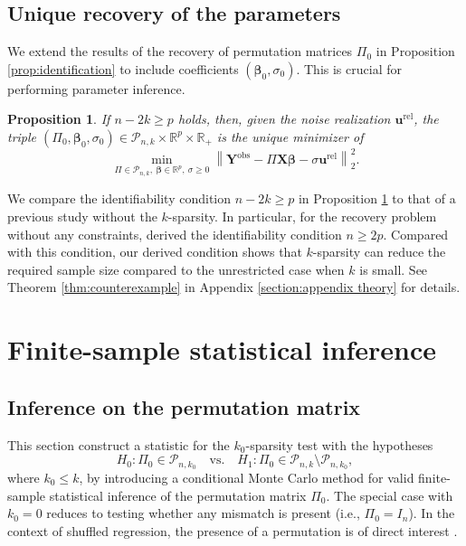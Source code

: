 \documentclass[11pt, reqno]{amsart}
\newcommand{\R}{\mathbb{R}}
\renewcommand{\le}{\leqslant}
\renewcommand{\ge}{\geqslant}
\newcommand{\mP}{\mathcal{P}}
\newcommand{\1}{\mbox{1}\hspace{-0.25em}\mbox{l}}
\newcommand{\obs}{\mathrm{obs}}
\newcommand{\rel}{\mathrm{rel}}
\theoremstyle{definition}\newtheorem{problem}{Problem}[section]
\theoremstyle{definition}\newtheorem{definition}[problem]{Definition}
\theoremstyle{remark}\newtheorem{assumption}{Assumption}
\theoremstyle{remark}\newtheorem{remark}[problem]{Remark}
\theoremstyle{definition}\newtheorem{example}[problem]{Example}
\theoremstyle{plain}\newtheorem{theorem}[problem]{Theorem}
\theoremstyle{plain}\newtheorem{question}[problem]{Question}
\theoremstyle{plain}\newtheorem{lemma}[problem]{Lemma}
\theoremstyle{plain}\newtheorem{proposition}[problem]{Proposition}
\theoremstyle{plain}\newtheorem{corollary}[problem]{Corollary}
\theoremstyle{plain}\newtheorem{conjecture}[problem]{Conjecture}
\begin{document}
\subsection{Unique recovery of the parameters}

We extend the results of the recovery of permutation matrices $\Pi_0$ in Proposition \ref{prop:identification} to include coefficients $(\bm{\beta}_0, \sigma_0) $. This is crucial for performing parameter inference.

\begin{proposition}\label{prop:identification_joint}
    If $n-2k\ge p$ holds, then, given the noise realization $\bm u^{\rel}$, the triple $(\Pi_0,\bm\beta_0,\sigma_0) \in \mP_{n,k} \times \R^p \times \R_+$ is the unique minimizer of
\begin{equation}\label{eq:repro_ideal}
   \min_{\Pi \in \mP_{n,k},\ \bm{\beta} \in \R^p,\ \sigma \ge 0 }
   \left\| \bm{Y}^{\obs} -  \Pi \bm{X} \bm{\beta} - \sigma \bm{u}^{\rel}\right\|_2^2.
\end{equation}
\end{proposition}
 
We compare the identifiability condition $n-2k\ge p$ in Proposition \ref{prop:identification_joint} to that of a previous study without the $k$-sparsity.
In particular, for the recovery problem without any constraints,  \citep{unnikrishnan2018unlabeled} derived the identifiability condition $n\ge 2p$.
Compared with this condition, our derived condition shows that $k$-sparsity can reduce the required sample size compared to the unrestricted case when $k$ is small.
See Theorem \ref{thm:counterexample} in Appendix \ref{section:appendix theory} for details.


\section{Finite-sample statistical inference}\label{sec:inference}

\subsection{Inference on the permutation matrix}\label{subsubsection:testing permutation}
This section construct a statistic for the $k_0$-sparsity test with the hypotheses
\begin{equation}\label{eq:hypothesis-k0}
    H_0:\Pi_0\in\mP_{n,k_0}\quad\text{vs.}\quad H_1:\Pi_0\in\mP_{n,k}\setminus\mP_{n,k_0},
\end{equation}
where $k_0 \le k$, by introducing a conditional Monte Carlo method for valid finite-sample statistical inference of the permutation matrix $\Pi_0$. The special case with $k_0=0$ reduces to testing whether any mismatch is present (i.e., $\Pi_0 = I_n$). In the context of shuffled regression, the presence of a permutation is of direct interest \citep{slawski2021pseudo}. 
\end{document}
